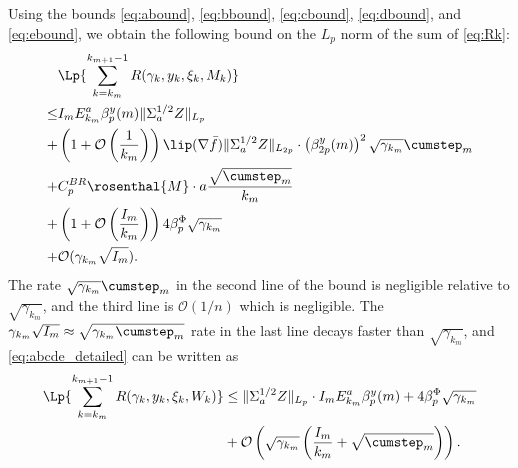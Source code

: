 \documentclass[11pt]{article}
\begin{document}
Using the bounds \eqref{eq:abound}, \eqref{eq:bbound}, \eqref{eq:cbound}, \eqref{eq:dbound}, and \eqref{eq:ebound}, we obtain the following bound on the $L_p$ norm of the sum of \eqref{eq:Rk}:
\begin{equation}\label{eq:abcde_detailed}
\begin{split}
    &\Lp{\sum_{k=k_m}^{k_{m+1} - 1} R(\gamma_k, y_k, \xi_k, M_k)}
    \\ 
    \leq & 
        I_m E_{k_m}^{a}  \beta_p^y (m) \lVert \Sigma_a^{1/2} Z \rVert_{L_p} 
    \\ +&
        \left(1 + \mathcal{O}\left( \frac{1}{k_m}\right) \right) \lip(\nabla \bar{f}) \lVert \Sigma_a^{1/2} Z \rVert_{L_{2p}} 
    \cdot \left(\beta_{2p}^y (m) \right)^2 \sqrt{\gamma_{k_m}}\cumstep_m
     \\ 
     + &
      C_p^{BR} \rosenthal{M} \cdot a\frac{\sqrt{\cumstep_m}}{k_m}   
      \\ 
      + & \left(1 + \mathcal{O}\left( \frac{I_m}{k_m}\right) \right) 4 \beta_p^\Phi \sqrt{\gamma_{k_m}}  
      \\ 
    + & 
    \mathcal{O}(\gamma_{k_m} \sqrt{I_m})
    .         
\end{split}
\end{equation}
The rate $\sqrt{\gamma_{k_m}} \cumstep_m$ in the second line of the bound is negligible relative to $\sqrt{\gamma_{k_m}}$, and the third line is $\mathcal{O}(1/n)$ which is negligible. 
The $\gamma_{k_m} \sqrt{I_m} \approx \sqrt{\gamma_{k_m} \cumstep_m}$ rate in the last line decays faster than $\sqrt{\gamma_{k_m}}$, and \eqref{eq:abcde_detailed} can be written as
\begin{equation}\label{eq:abcde}
\begin{split}
    \Lp{\sum_{k=k_m}^{k_{m+1} - 1} R(\gamma_k, y_k, \xi_k, W_k)}
    &\leq 
     \lVert \Sigma_a^{1/2}Z \rVert_{L_p} \cdot I_m E_{k_m}^a \beta_p^y (m)
    +
    4    \beta_p^\Phi \sqrt{\gamma_{k_m}}
    \\ &+
    \mathcal{O}\left( \sqrt{\gamma_{k_m}} \left( \frac{I_m}{k_m} + \sqrt{\cumstep_m}\right) \right)
    .    
\end{split}    
\end{equation}
\end{document}
